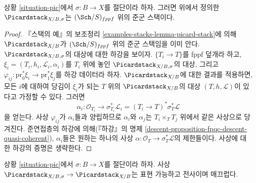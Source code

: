 \begin{lemma}
\label{lemma-pic-with-section-stack}
상황 \ref{situation-pic}에서 $\sigma : B \to X$를 절단이라 하자.
그러면 위에서 정의한 $\Picardstack_{X/B, \sigma}$는
$(\Sch/S)_{fppf}$ 위의 준군 스택이다.
\end{lemma}

\begin{proof}
『스택의 예』의 보조정리 \ref{examples-stacks-lemma-picard-stack}에 의해
$\Picardstack_{X/B}$가 $(\Sch/S)_{fppf}$ 위의 준군 스택임을 이미 안다.
$\Picardstack_{X/B, \sigma}$의 대상에 대한 하강을 보이자.
$\{T_i \to T\}$를 fppf 덮개라 하고,
$\xi_i = (T_i, h_i, \mathcal{L}_i, \alpha_i)$를 $T_i$ 위에 놓인
$\Picardstack_{X/B, \sigma}$의 대상, 그리고
$\varphi_{ij} : \text{pr}_0^*\xi_i \to \text{pr}_1^*\xi_j$를
하강 데이터라 하자. $\Picardstack_{X/B}$에 대한 결과를 적용하면,
모든 $i$에 대하여 당김이 $\xi_i$가 되는 $T$ 위의
$\Picardstack_{X/B}$의 대상 $(T, h, \mathcal{L})$이 있다고 가정할 수 있다.
그러면
$$
\alpha_i : \mathcal{O}_{T_i} \to \sigma_{T_i}^*\mathcal{L}_i =
(T_i \to T)^*\sigma_T^*\mathcal{L}
$$
을 얻는다. 사상 $\varphi_{ij}$가 $\alpha_i$들과 양립하므로
$\alpha_i$와 $\alpha_j$는 $T_i \times_T T_j$ 위에서 같은 사상으로 당겨진다.
준연접층의 하강에 의해(『하강』의 명제
\ref{descent-proposition-fpqc-descent-quasi-coherent}), $\alpha_i$들은
원하는 하나의 사상 $\alpha : \mathcal{O}_T \to \sigma_T^*\mathcal{L}$의
제한들이다. 사상에 대한 하강의 증명은 생략한다.
\end{proof}

\begin{lemma}
\label{lemma-compare-pic-with-section}
상황 \ref{situation-pic}에서 $\sigma : B \to X$를 절단이라 하자.
사상 $\Picardstack_{X/B, \sigma} \to \Picardstack_{X/B}$는
표현 가능하고 전사이며 매끄럽다.
\end{lemma}

